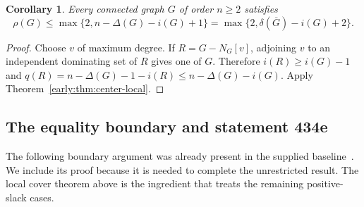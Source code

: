\documentclass[11pt,a4paper]{article}
\newtheorem{corollary}[theorem]{Corollary}
\theoremstyle{definition}\newtheorem{definition}[theorem]{Definition}
\theoremstyle{remark}\newtheorem{remark}[theorem]{Remark}
\begin{document}
\begin{corollary}
\label{early:cor:center-degree}
Every connected graph $G$ of order $n\geq2$ satisfies
\[
 \rho(G)\leq\max\{2,n-\Delta(G)-i(G)+1\}
 =\max\{2,\delta(\overline G)-i(G)+2\}.
\]
\end{corollary}
\begin{proof}
Choose $v$ of maximum degree.  If $R=G-N_G[v]$, adjoining $v$ to an
independent dominating set of $R$ gives one of $G$.  Therefore
$i(R)\geq i(G)-1$ and
$q(R)=n-\Delta(G)-1-i(R)\leq n-\Delta(G)-i(G)$.  Apply
Theorem~\ref{early:thm:center-local}.
\end{proof}

\subsection{The equality boundary and statement 434e}

The following boundary argument was already present in the supplied
baseline~\cite{early:baseline}.  We include its proof because it is needed
to complete the unrestricted result.  The local cover theorem above is the
ingredient that treats the remaining positive-slack cases.
\end{document}

